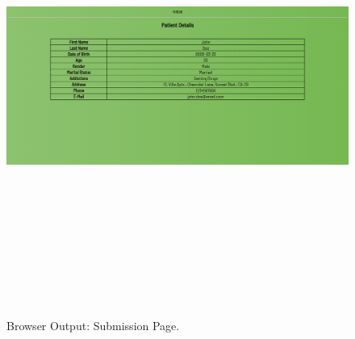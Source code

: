\documentclass[12pt, a4]{article}
\begin{document}
\subsection*{}
\begin{figure}[h]
\centering
\caption{Browser Output: Submission Page.}
\includegraphics[height=15cm, width=18cm]{Output/FormTable.png}
\end{figure}

\newpage
\end{document}
